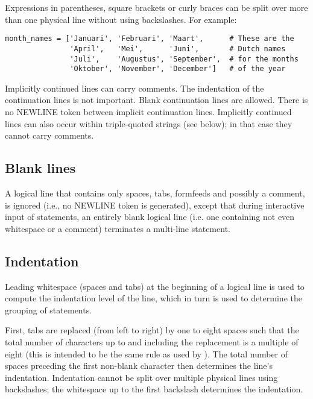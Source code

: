 Expressions in parentheses, square brackets or curly braces can be
split over more than one physical line without using backslashes.
For example:

\begin{verbatim}
month_names = ['Januari', 'Februari', 'Maart',      # These are the
               'April',   'Mei',      'Juni',       # Dutch names
               'Juli',    'Augustus', 'September',  # for the months
               'Oktober', 'November', 'December']   # of the year
\end{verbatim}

Implicitly continued lines can carry comments.  The indentation of the
continuation lines is not important.  Blank continuation lines are
allowed.  There is no NEWLINE token between implicit continuation
lines.  Implicitly continued lines can also occur within triple-quoted
strings (see below); in that case they cannot carry comments.

\subsection{Blank lines}

A logical line that contains only spaces, tabs, formfeeds and possibly a
comment, is ignored (i.e., no NEWLINE token is generated), except that
during interactive input of statements, an entirely blank logical line
(i.e. one containing not even whitespace or a comment)
terminates a multi-line statement.

\subsection{Indentation}

Leading whitespace (spaces and tabs) at the beginning of a logical
line is used to compute the indentation level of the line, which in
turn is used to determine the grouping of statements.

First, tabs are replaced (from left to right) by one to eight spaces
such that the total number of characters up to and including the
replacement is a multiple of
eight (this is intended to be the same rule as used by \UNIX{}).  The
total number of spaces preceding the first non-blank character then
determines the line's indentation.  Indentation cannot be split over
multiple physical lines using backslashes; the whitespace up to the
first backslash determines the indentation.

